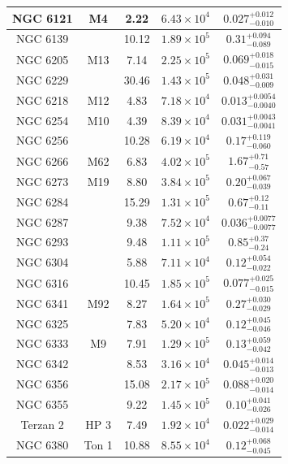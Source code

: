 \begin{longtable}{|c|c|c|c|c|}
\hline
NGC 6121 & M4 & 2.22 & $6.43\times 10^{4}$ & $0.027_{-0.010}^{+0.012 }$ \\
\hline
NGC 6139 &  & 10.12 & $1.89\times 10^{5}$ & $0.31_{-0.089}^{+0.094 }$ \\
\hline
NGC 6205 & M13 & 7.14 & $2.25\times 10^{5}$ & $0.069_{-0.015}^{+0.018 }$ \\
\hline
NGC 6229 &  & 30.46 & $1.43\times 10^{5}$ & $0.048_{-0.009}^{+0.031 }$ \\
\hline
NGC 6218 & M12 & 4.83 & $7.18\times 10^{4}$ & $0.013_{-0.0040}^{+0.0054}$ \\
\hline
NGC 6254 & M10 & 4.39 & $8.39\times 10^{4}$ & $0.031_{-0.0041}^{+0.0043}$ \\
\hline
NGC 6256 &  & 10.28 & $6.19\times 10^{4}$ & $0.17_{-0.060}^{+0.119 }$ \\
\hline
NGC 6266 & M62 & 6.83 & $4.02\times 10^{5}$ & $1.67_{-0.57}^{+0.71 }$ \\
\hline
NGC 6273 & M19 & 8.80 & $3.84\times 10^{5}$ & $0.20_{-0.039}^{+0.067 }$ \\
\hline
NGC 6284 &  & 15.29 & $1.31\times 10^{5}$ & $0.67_{-0.11}^{+0.12 }$ \\
\hline
NGC 6287 & & 9.38 & $7.52\times 10^{4}$ & $0.036_{-0.0077}^{+0.0077 }$ \\
\hline
NGC 6293 & & 9.48 & $1.11\times 10^{5}$ & $0.85_{-0.24}^{+0.37 }$ \\
\hline
NGC 6304 & & 5.88 & $7.11\times 10^{4}$ & $0.12_{-0.022}^{+0.054 }$ \\
\hline
NGC 6316 & & 10.45 & $1.85\times 10^{5}$ & $0.077_{-0.015}^{+0.025 }$ \\
\hline
NGC 6341 & M92 & 8.27 & $1.64\times 10^{5}$ & $0.27_{-0.029}^{+0.030 }$ \\
\hline
NGC 6325 & & 7.83 & $5.20\times 10^{4}$ & $0.12_{-0.046}^{+0.045 }$ \\
\hline
NGC 6333 & M9 & 7.91 & $1.29\times 10^{5}$ & $0.13_{-0.042}^{+0.059 }$ \\
\hline
NGC 6342 & & 8.53 & $3.16\times 10^{4}$ & $0.045_{-0.013}^{+0.014 }$ \\
\hline
NGC 6356 & & 15.08 & $2.17\times 10^{5}$ & $0.088_{-0.014}^{+0.020 }$ \\
\hline
NGC 6355 & & 9.22 & $1.45\times 10^{5}$ & $0.10_{-0.026}^{+0.041 }$ \\
\hline
Terzan 2 & HP 3 & 7.49 & $1.92\times 10^{4}$ & $0.022_{-0.014}^{+0.029 }$ \\
\hline
NGC 6380 & Ton 1 & 10.88 & $8.55\times 10^{4}$ & $0.12_{-0.045}^{+0.068 }$ \\

\end{longtable}
